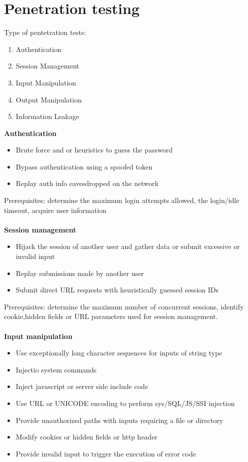 \documentclass[10pt,a4paper]{article}
\begin{document}
\section{Penetration testing}
Type of pentetration tests:
\begin{enumerate}
\item Authentication
\item Session Management
\item Input Manipulation
\item Output Manipulation
\item Information Leakage
\end{enumerate}
\textbf{Authentication}
\begin{itemize}
\item Brute force and or heuristics to guess the password
\item Bypass authentication using a spoofed token
\item Replay auth info eavesdropped on the network
\end{itemize} 
Prerequisites: determine the maximum login attempts allowed, the login/idle timeout, acquire user information\\\\
\textbf{Session management}
\begin{itemize}
\item Hijack the session of another user and gather data or submit excessive or invalid input
\item Replay submissions made by another user
\item Submit direct URL requests with heuristically guessed session IDs
\end{itemize}
Prerequisites: determine the maximum number of concurrent sessions, identify cookie,hidden fields or URL parameters used for session management.\\\\
\textbf{Input manipulation}\\
\begin{itemize}
\item Use exceptionally long character sequences for inputs of string type
\item Injectio system commands
\item Inject javascript or server side include code
\item Use URL or UNICODE encoding to perform sys/SQL/JS/SSI injection
\item Provide unauthorized paths with inputs requiring a file or directory
\item Modify cookies or hidden fields or http header
\item Provide invalid input to trigger the execution of error code
\end{itemize}
\end{document}
